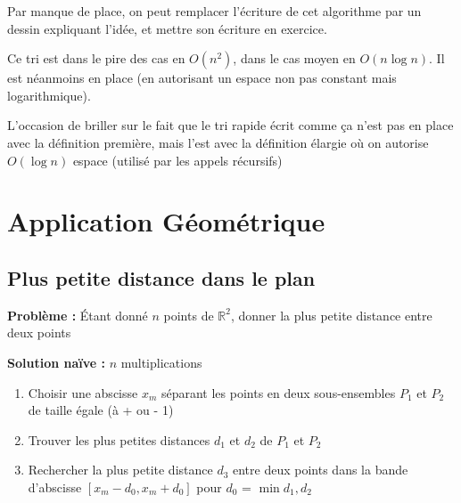 \begin{com}
	Par manque de place, on peut remplacer l'écriture de cet algorithme par un dessin expliquant l'idée, et mettre son écriture en exercice.
\end{com}

\begin{proposition}
	Ce tri est dans le pire des cas en $O(n^2)$, dans le cas moyen en $O(n \log n)$. Il est néanmoins en place (en autorisant un espace non pas constant mais logarithmique).
\end{proposition}

\begin{com}
	L'occasion de briller sur le fait que le tri rapide écrit comme ça n'est pas en place avec la définition première, mais l'est avec la définition élargie où on autorise $O(\log n)$ espace (utilisé par les appels récursifs)
\end{com}

\section{Application Géométrique}

\subsection{Plus petite distance dans le plan}

\textbf{Problème :} Étant donné $n$ points de $\mathbb R^2$, donner la plus petite distance entre deux points

\textbf{Solution naïve :} $n$ multiplications

\begin{algo}[Solution D\&R]
	\begin{enumerate}
		\item Choisir une abscisse $x_m$ séparant les points en deux sous-ensembles $P_1$ et $P_2$ de taille égale (à + ou - 1)
	
		\item Trouver les plus petites distances $d_1$ et $d_2$ de $P_1$ et $P_2$
	
		\item Rechercher la plus petite distance $d_3$ entre deux points dans la bande d’abscisse $[x_m-d_0, x_m+d_0]$ pour $d_0$ = $\min d_1, d_2$
	
	\end{enumerate}
\end{algo}

